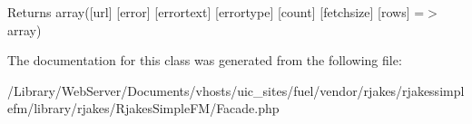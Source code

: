 \begin{DoxyReturn}{Returns}
array(\mbox{[}url\mbox{]} \mbox{[}error\mbox{]} \mbox{[}errortext\mbox{]} \mbox{[}errortype\mbox{]} \mbox{[}count\mbox{]} \mbox{[}fetchsize\mbox{]} \mbox{[}rows\mbox{]} =$>$ array) 
\end{DoxyReturn}


The documentation for this class was generated from the following file\+:\begin{DoxyCompactItemize}
\item 
/\+Library/\+Web\+Server/\+Documents/vhosts/uic\+\_\+sites/fuel/vendor/rjakes/rjakessimplefm/library/rjakes/\+Rjakes\+Simple\+F\+M/Facade.\+php\end{DoxyCompactItemize}
